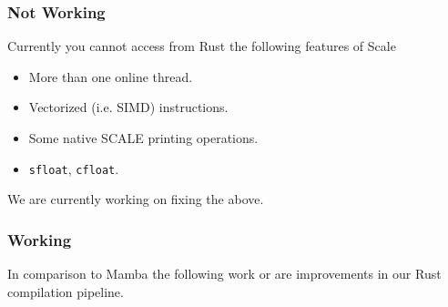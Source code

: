 \subsubsection{Not Working}
Currently you cannot access from Rust the following features of Scale
\begin{itemize}
     \item More than one online thread.
     \item Vectorized (i.e. SIMD) instructions.
     \item Some native SCALE printing operations.
     \item \verb|sfloat|, \verb|cfloat|.
\end{itemize}
We are currently working on fixing the above.

\subsubsection{Working}
In comparison to Mamba the following work or are improvements
in our Rust compilation pipeline.
